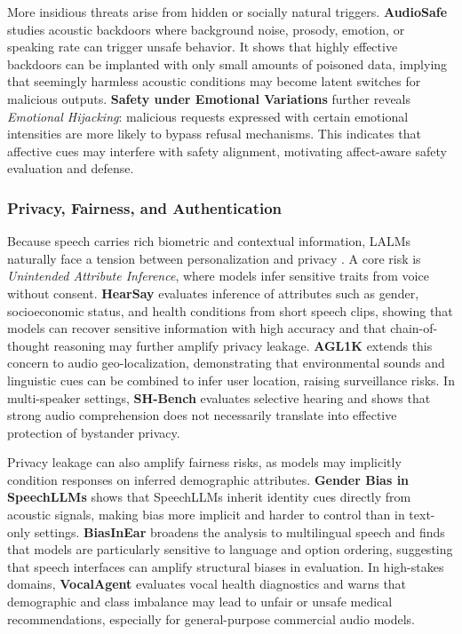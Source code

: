 \documentclass{llmxive}
\begin{document}
More insidious threats arise from hidden or socially natural triggers. \textbf{AudioSafe} \cite{lin2025hidden} studies acoustic backdoors where background noise, prosody, emotion, or speaking rate can trigger unsafe behavior. It shows that highly effective backdoors can be implanted with only small amounts of poisoned data, implying that seemingly harmless acoustic conditions may become latent switches for malicious outputs. \textbf{Safety under Emotional Variations} \cite{feng2025investigating} further reveals \textit{Emotional Hijacking}: malicious requests expressed with certain emotional intensities are more likely to bypass refusal mechanisms. This indicates that affective cues may interfere with safety alignment, motivating affect-aware safety evaluation and defense.

\subsubsection{Privacy, Fairness, and Authentication}
\label{sec:5.3.2}

Because speech carries rich biometric and contextual information, LALMs naturally face a tension between personalization and privacy \cite{wang2026voxsafebench}. A core risk is \textit{Unintended Attribute Inference}, where models infer sensitive traits from voice without consent. \textbf{HearSay} \cite{wang2026hearsay} evaluates inference of attributes such as gender, socioeconomic status, and health conditions from short speech clips, showing that models can recover sensitive information with high accuracy and that chain-of-thought reasoning may further amplify privacy leakage. \textbf{AGL1K} \cite{zhang2026sonar} extends this concern to audio geo-localization, demonstrating that environmental sounds and linguistic cues can be combined to infer user location, raising surveillance risks. In multi-speaker settings, \textbf{SH-Bench} \cite{zhan2025protecting} evaluates selective hearing and shows that strong audio comprehension does not necessarily translate into effective protection of bystander privacy.

Privacy leakage can also amplify fairness risks, as models may implicitly condition responses on inferred demographic attributes. \textbf{Gender Bias in SpeechLLMs} \cite{satish2025bias} shows that SpeechLLMs inherit identity cues directly from acoustic signals, making bias more implicit and harder to control than in text-only settings. \textbf{BiasInEar} \cite{wei2026bias} broadens the analysis to multilingual speech and finds that models are particularly sensitive to language and option ordering, suggesting that speech interfaces can amplify structural biases in evaluation. In high-stakes domains, \textbf{VocalAgent} \cite{kim2025vocalagent} evaluates vocal health diagnostics and warns that demographic and class imbalance may lead to unfair or unsafe medical recommendations, especially for general-purpose commercial audio models.
\end{document}
